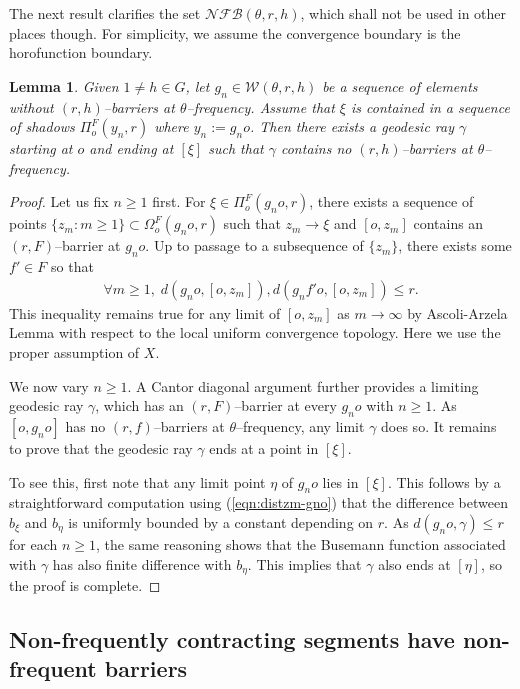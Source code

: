 \documentclass{amsart}
\newtheorem{lem}[thm]{Lemma}
\theoremstyle{definition}
\theoremstyle{remark}
\begin{document}
The next   result clarifies the set $\mathcal{NFB}(\theta,r, h)$, which shall not be used in other places though.  For simplicity, we assume the convergence boundary  is the horofunction boundary.
\begin{lem}
Given $1\ne h\in G$, let $g_n\in \mathcal W(\theta,r,h)$ be a sequence of  elements without $(r, h)$--barriers at $\theta$--frequency. Assume that $\xi$ is contained in a sequence of  shadows  $\Pi_o^F(y_n,r)$ where $y_n:=g_no$. Then there exists a geodesic ray $\gamma$ starting at $o$ and ending at $[\xi]$ such that $\gamma$ contains no  $(r, h)$--barriers at $\theta$--frequency.
\end{lem}
\begin{proof}
Let us fix $n\ge 1$ first. For $\xi\in \Pi_o^F(g_no,r)$, there exists a sequence of points $\{z_m: m\ge 1\}\subset \Omega_o^F(g_no,r)$ such that $z_m\to \xi$ and $[o,z_m]$ contains an $(r, F)$--barrier at $g_no$. Up to passage to a subsequence of $\{z_m\}$, there exists some $f'\in F$ so that
\begin{align}\label{eqn:distzm-gno}
\forall m\ge 1, \; d(g_no, [o,z_m]), d(g_nf'o, [o,z_m])\le r.    
\end{align}
This inequality remains true for any limit of $[o,z_m]$ as $m\to\infty$ by Ascoli-Arzela Lemma with respect to the local uniform convergence topology. Here we use the proper assumption of $X$.

We now vary $n\ge 1$. A Cantor diagonal argument further provides a limiting geodesic ray $\gamma$, which has an   $(r, F)$--barrier at every  $g_no$ with $n\ge 1$. As $[o,g_no]$ has no  $(r, f)$--barriers at $\theta$--frequency, any limit  $\gamma$ does so.  It remains to prove that the geodesic ray $\gamma$ ends at a point in $[\xi]$. 

To see this, first note that any limit point $\eta$ of $g_no$ lies in $[\xi]$. This follows by a {straightforward computation using (\ref{eqn:distzm-gno}) that  the difference between $b_\xi$ and $b_\eta$ is uniformly bounded by a constant depending on $r$}. As $d(g_no, \gamma)\le r$ for each $n\ge 1$, the same reasoning shows that the Busemann function associated  with $\gamma$ has also finite difference with $b_\eta$. This implies that $\gamma$ also ends at $[\eta]$, so  the proof is complete.
\end{proof}


\subsection{Non-frequently contracting segments have non-frequent barriers}
\end{document}
